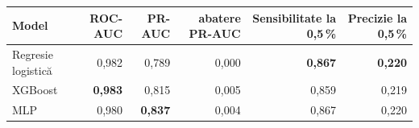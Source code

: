 \begin{tabular}{lrrrrr}
\toprule
Model & ROC-AUC & PR-AUC & abatere PR-AUC & Sensibilitate la 0,5\,\% & Precizie la 0,5\,\% \\
\midrule
Regresie logistică & 0,982 & 0,789 & 0,000 & \textbf{0,867} & \textbf{0,220} \\
XGBoost & \textbf{0,983} & 0,815 & 0,005 & 0,859 & 0,219 \\
MLP & 0,980 & \textbf{0,837} & 0,004 & 0,867 & 0,220 \\
\bottomrule
\end{tabular}

